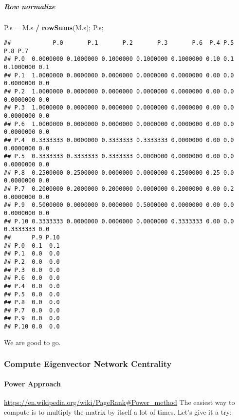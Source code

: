 \documentclass[
]{article}
\newenvironment{Shaded}{\begin{snugshade}}{\end{snugshade}}
\newcommand{\KeywordTok}[1]{\textcolor[rgb]{0.13,0.29,0.53}{\textbf{#1}}}
\newcommand{\NormalTok}[1]{#1}
\newcommand{\OperatorTok}[1]{\textcolor[rgb]{0.81,0.36,0.00}{\textbf{#1}}}
\newcommand{\StringTok}[1]{\textcolor[rgb]{0.31,0.60,0.02}{#1}}
\begin{document}
\hypertarget{row-normalize}{%
\subparagraph{Row normalize}\label{row-normalize}}

\begin{Shaded}
\begin{Highlighting}[]
\NormalTok{P.s =}\StringTok{ }\NormalTok{M.s }\OperatorTok{/}\StringTok{ }\KeywordTok{rowSums}\NormalTok{(M.s);}
\NormalTok{P.s;}
\end{Highlighting}
\end{Shaded}

\begin{verbatim}
##            P.0       P.1       P.2       P.3       P.6  P.4 P.5       P.8 P.7
## P.0  0.0000000 0.1000000 0.1000000 0.1000000 0.1000000 0.10 0.1 0.1000000 0.1
## P.1  1.0000000 0.0000000 0.0000000 0.0000000 0.0000000 0.00 0.0 0.0000000 0.0
## P.2  1.0000000 0.0000000 0.0000000 0.0000000 0.0000000 0.00 0.0 0.0000000 0.0
## P.3  1.0000000 0.0000000 0.0000000 0.0000000 0.0000000 0.00 0.0 0.0000000 0.0
## P.6  1.0000000 0.0000000 0.0000000 0.0000000 0.0000000 0.00 0.0 0.0000000 0.0
## P.4  0.3333333 0.0000000 0.3333333 0.3333333 0.0000000 0.00 0.0 0.0000000 0.0
## P.5  0.3333333 0.3333333 0.3333333 0.0000000 0.0000000 0.00 0.0 0.0000000 0.0
## P.8  0.2500000 0.2500000 0.0000000 0.0000000 0.2500000 0.25 0.0 0.0000000 0.0
## P.7  0.2000000 0.2000000 0.2000000 0.0000000 0.2000000 0.00 0.2 0.0000000 0.0
## P.9  0.5000000 0.0000000 0.0000000 0.5000000 0.0000000 0.00 0.0 0.0000000 0.0
## P.10 0.3333333 0.0000000 0.0000000 0.0000000 0.3333333 0.00 0.0 0.3333333 0.0
##      P.9 P.10
## P.0  0.1  0.1
## P.1  0.0  0.0
## P.2  0.0  0.0
## P.3  0.0  0.0
## P.6  0.0  0.0
## P.4  0.0  0.0
## P.5  0.0  0.0
## P.8  0.0  0.0
## P.7  0.0  0.0
## P.9  0.0  0.0
## P.10 0.0  0.0
\end{verbatim}

We are good to go.

\hypertarget{compute-eigenvector-network-centrality}{%
\subsubsection{Compute Eigenvector Network
Centrality}\label{compute-eigenvector-network-centrality}}

\hypertarget{power-approach}{%
\paragraph{Power Approach}\label{power-approach}}

\url{https://en.wikipedia.org/wiki/PageRank\#Power_method} The easiest
way to compute is to multiply the matrix by itself a lot of times. Let's
give it a try:
\end{document}
